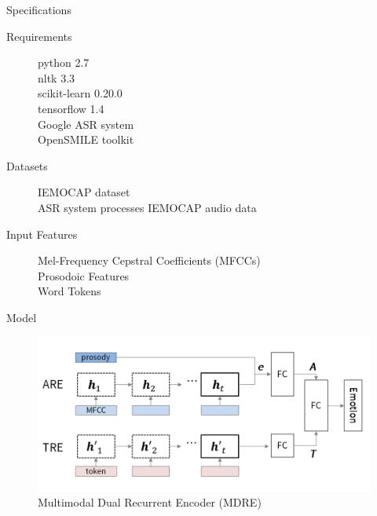 \documentclass{beamer}
\begin{document}
    \begin{frame}{Specifications}
        \begin{description}
            \item[Requirements]
                python 2.7 \\
                nltk 3.3 \\
                scikit-learn 0.20.0 \\
                tensorflow 1.4 \\
                Google ASR system \\
                OpenSMILE toolkit
            \item[Datasets]
                IEMOCAP dataset \\
                ASR system processes IEMOCAP audio data
            \item[Input Features]
                Mel-Frequency Cepstral Coefficients (MFCCs) \\
                Prosodoic Features \\
                Word Tokens \\
        \end{description}
    \end{frame}
    
    \begin{frame}{Model}
        \begin{figure}
            \includegraphics[width = 1\linewidth]{Images/model.PNG}
            \caption{Multimodal Dual Recurrent Encoder (MDRE)}
            \label{fig:MDRE}
        \end{figure}
    \end{frame}
        
\end{document}

